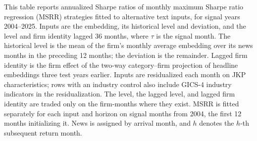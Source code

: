 \begin{table}[htbp]
\centering
\caption{MSRR Strategy Sharpe Ratios under Alternative Inputs}
\label{tab:tabA_constructions}
\begin{minipage}{\linewidth}\footnotesize
This table reports annualized Sharpe ratios of monthly maximum Sharpe ratio regression (MSRR) strategies fitted to alternative text inputs, for signal years 2004--2025. Inputs are the embedding, its historical level and deviation, and the level and firm identity lagged 36 months, where $\tau$ is the signal month. The historical level is the mean of the firm's monthly average embedding over its news months in the preceding 12 months; the deviation is the remainder. Lagged firm identity is the firm effect of the two-way category--firm projection of headline embeddings three test years earlier. Inputs are residualized each month on JKP characteristics; rows with an industry control also include GICS-4 industry indicators in the residualization. The level, the lagged level, and lagged firm identity are traded only on the firm-months where they exist. MSRR is fitted separately for each input and horizon on signal months from 2004, the first 12 months initializing it. News is assigned by arrival month, and $h$ denotes the $h$-th subsequent return month.
\end{minipage}
\medskip


\end{table}
